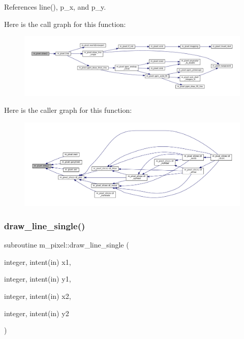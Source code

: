 References line(), p\+\_\+x, and p\+\_\+y.

Here is the call graph for this function\+:
\nopagebreak
\begin{figure}[H]
\begin{center}
\leavevmode
\includegraphics[width=350pt]{namespacem__pixel_a12012e819bb14b27d2b49732aa2e4e55_cgraph}
\end{center}
\end{figure}
Here is the caller graph for this function\+:
\nopagebreak
\begin{figure}[H]
\begin{center}
\leavevmode
\includegraphics[width=350pt]{namespacem__pixel_a12012e819bb14b27d2b49732aa2e4e55_icgraph}
\end{center}
\end{figure}
\mbox{\label{namespacem__pixel_a42791c7e58158616dae7c36ec5806717}} 
\subsubsection{\texorpdfstring{draw\+\_\+line\+\_\+single()}{draw\_line\_single()}}
{\footnotesize\ttfamily subroutine m\+\_\+pixel\+::draw\+\_\+line\+\_\+single (\begin{DoxyParamCaption}\item[{integer, intent(in)}]{x1,  }\item[{integer, intent(in)}]{y1,  }\item[{integer, intent(in)}]{x2,  }\item[{integer, intent(in)}]{y2 }\end{DoxyParamCaption})\hspace{0.3cm}{\ttfamily [private]}}



